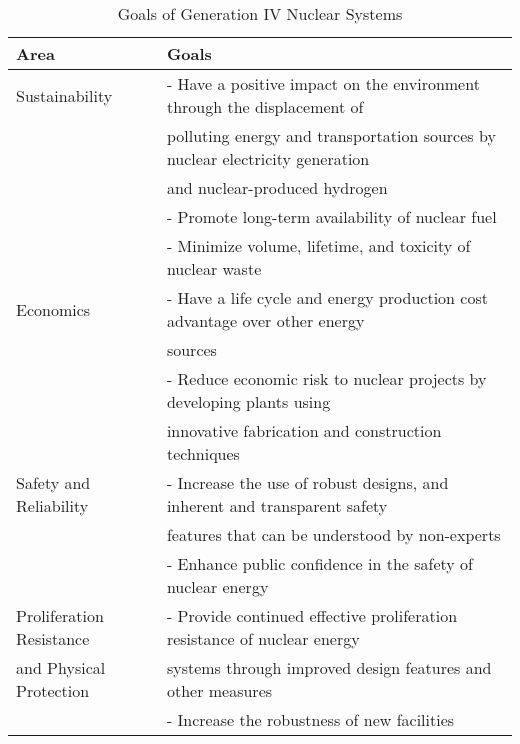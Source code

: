 \begin{table}[]
    \centering
    \onehalfspacing
    \caption{Goals of Generation IV Nuclear Systems \cite{gif_technology_2002,
    behar_technology_2014}}
	\label{tab:goals-gen4}
    \small
    \begin{tabular}{l|l}
    \hline
                               \textbf{Area} & \textbf{Goals} \\ \hline
    Sustainability   & - Have a positive impact on the environment through the displacement of \\
    & polluting energy and transportation sources by nuclear electricity generation \\
    & and nuclear-produced hydrogen \\ 
    & - Promote long-term availability of nuclear fuel \\
    & - Minimize volume, lifetime, and toxicity of nuclear waste \\ \hline
    Economics & - Have a life cycle and energy production cost advantage over other energy \\
    & sources \\ 
    & - Reduce economic risk to nuclear projects by developing plants using \\
    & innovative fabrication and construction techniques \\ \hline
    Safety and Reliability   & - Increase the use of robust designs, and inherent and transparent safety\\
    & features that can be understood by non-experts \\ 
    & - Enhance public confidence in the safety of nuclear energy \\\hline
    Proliferation Resistance & - Provide continued effective proliferation resistance of nuclear energy \\
    and Physical Protection & systems through improved design features and other measures \\ 
    & - Increase the robustness of new facilities \\ \hline
    \end{tabular}
    \end{table}


